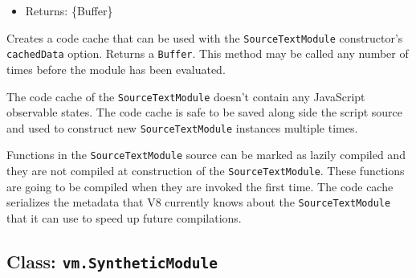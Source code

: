 \begin{itemize}
\tightlist
\item
  Returns: \{Buffer\}
\end{itemize}

Creates a code cache that can be used with the \texttt{SourceTextModule}
constructor's \texttt{cachedData} option. Returns a \texttt{Buffer}.
This method may be called any number of times before the module has been
evaluated.

The code cache of the \texttt{SourceTextModule} doesn't contain any
JavaScript observable states. The code cache is safe to be saved along
side the script source and used to construct new
\texttt{SourceTextModule} instances multiple times.

Functions in the \texttt{SourceTextModule} source can be marked as
lazily compiled and they are not compiled at construction of the
\texttt{SourceTextModule}. These functions are going to be compiled when
they are invoked the first time. The code cache serializes the metadata
that V8 currently knows about the \texttt{SourceTextModule} that it can
use to speed up future compilations.

\begin{Shaded}
\begin{Highlighting}[]
\OperatorTok{=} \NormalTok{(}\NormalTok{)}\OperatorTok{;}

\OperatorTok{=}\NormalTok{()}\OperatorTok{;}

\OperatorTok{=} \NormalTok{(}\OperatorTok{,}\OperatorTok{;}
\end{Highlighting}
\end{Shaded}

\subsection{\texorpdfstring{Class:
\texttt{vm.SyntheticModule}}{Class: vm.SyntheticModule}}\label{class-vm.syntheticmodule}

